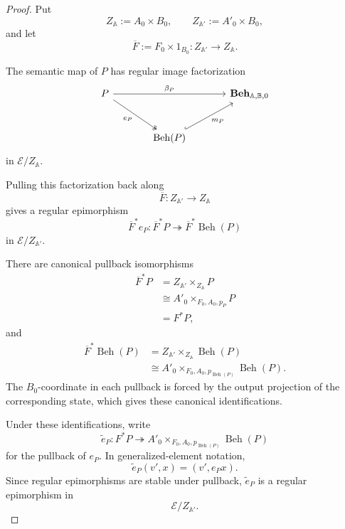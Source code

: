 \begin{proof}
    Put
    \[
        Z_{\mathbb A}:=A_0\times B_0,
        \qquad
        Z_{\mathbb A'}:=A'_0\times B_0,
    \]
    and let
    \[
        \overline F
        :=
        F_0\times1_{B_0}:
        Z_{\mathbb A'}\to Z_{\mathbb A}.
    \]

    The semantic map of \(P\) has regular image factorization
    \[
    \begin{tikzcd}[column sep=large, row sep=large]
        P
            \arrow[rr, "\beta_P"]
            \arrow[dr, two heads, "e_P"']
        &&
        \mathbf{Beh}_{\mathbb A,\mathbb B,0}
        \\
        &
        \operatorname{Beh}(P)
            \arrow[ur, hook, "m_P"']
        &
    \end{tikzcd}
    \]
    in \(\mathcal E/Z_{\mathbb A}\).

    Pulling this factorization back along
    \[
        \overline F:
        Z_{\mathbb A'}\to Z_{\mathbb A}
    \]
    gives a regular epimorphism
    \[
        \overline F^*e_P:
        \overline F^*P
        \twoheadrightarrow
        \overline F^*\operatorname{Beh}(P)
    \]
    in \(\mathcal E/Z_{\mathbb A'}\).

    There are canonical pullback isomorphisms
    \[
    \begin{aligned}
        \overline F^*P
        &=
        Z_{\mathbb A'}
        \times_{Z_{\mathbb A}}
        P
        \\
        &\cong
        A'_0
        \times_{F_0,A_0,p_P}
        P
        \\
        &=
        F^*P,
    \end{aligned}
    \]
    and
    \[
    \begin{aligned}
        \overline F^*\operatorname{Beh}(P)
        &=
        Z_{\mathbb A'}
        \times_{Z_{\mathbb A}}
        \operatorname{Beh}(P)
        \\
        &\cong
        A'_0
        \times_{F_0,A_0,p_{\operatorname{Beh}(P)}}
        \operatorname{Beh}(P).
    \end{aligned}
    \]
    The \(B_0\)-coordinate in each pullback is forced by the output projection
    of the corresponding state, which gives these canonical
    identifications.

    Under these identifications, write
    \[
        \widetilde e_P:
        F^*P
        \twoheadrightarrow
        A'_0
        \times_{F_0,A_0,p_{\operatorname{Beh}(P)}}
        \operatorname{Beh}(P)
    \]
    for the pullback of \(e_P\). In generalized-element notation,
    \[
        \widetilde e_P(v',x)
        =
        (v',e_Px).
    \]
    Since regular epimorphisms are stable under pullback,
    \(\widetilde e_P\) is a regular epimorphism in
    \[
        \mathcal E/Z_{\mathbb A'}.
    \]


\end{proof}
